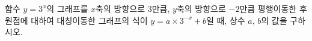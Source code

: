 함수 $y=3^x$의 그래프를 $x$축의 방향으로 $3$만큼, $y$축의 방향으로 $-2$만큼 평행이동한 후 원점에 대하여 대칭이동한 그래프의 식이 $y=a\times 3^{-x}+b$일 때, 상수 $a$, $b$의 값을 구하시오.
